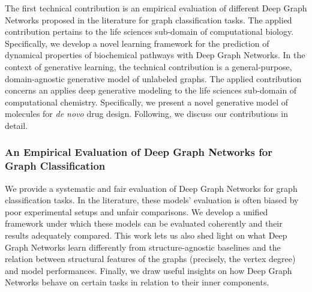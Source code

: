 The first technical contribution is an empirical evaluation of different Deep Graph Networks proposed in the literature for graph classification tasks. The applied contribution pertains to the life sciences sub-domain of computational biology. Specifically, we develop a novel learning framework for the prediction of dynamical properties of biochemical pathways with Deep Graph Networks. In the context of generative learning, the technical contribution is a general-purpose, domain-agnostic generative model of unlabeled graphs. The applied contribution concerns an applies deep generative modeling to the life sciences sub-domain of computational chemistry. Specifically, we present a novel generative model of molecules for \emph{de novo} drug design. Following, we discuss our contributions in detail.

\subsubsection*{An Empirical Evaluation of Deep Graph Networks for Graph Classification}
We provide a systematic and fair evaluation of Deep Graph Networks for graph classification tasks. In the literature, these models' evaluation is often biased by poor experimental setups and unfair comparisons. We develop a unified framework under which these models can be evaluated coherently and their results adequately compared. This work lets us also shed light on what Deep Graph Networks learn differently from structure-agnostic baselines and the relation between structural features of the graphs (precisely, the vertex degree) and model performances. Finally, we draw useful insights on how Deep Graph Networks behave on certain tasks in relation to their inner components.

